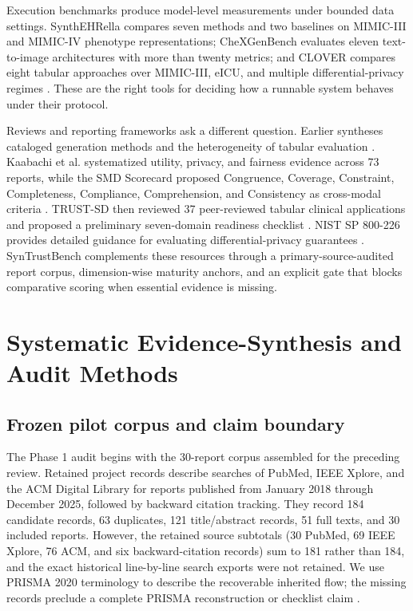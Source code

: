 \documentclass[11pt,letterpaper]{article}
\begin{document}
\endgroup

Execution benchmarks produce model-level measurements under bounded data settings. SynthEHRella compares seven methods and two baselines on MIMIC-III and MIMIC-IV phenotype representations; CheXGenBench evaluates eleven text-to-image architectures with more than twenty metrics; and CLOVER compares eight tabular approaches over MIMIC-III, eICU, and multiple differential-privacy regimes \citep{chen2025synthehrella,dutt2026chexgenbench,qi2026clover}. These are the right tools for deciding how a runnable system behaves under their protocol.

Reviews and reporting frameworks ask a different question. Earlier syntheses cataloged generation methods and the heterogeneity of tabular evaluation \citep{chen2021syntheticmedicine,hernandez2022tabularreview}. Kaabachi et al. systematized utility, privacy, and fairness evidence across 73 reports, while the SMD Scorecard proposed Congruence, Coverage, Constraint, Completeness, Compliance, Comprehension, and Consistency as cross-modal criteria \citep{kaabachi2025privacyutility,zamzmi2025scorecard}. TRUST-SD then reviewed 37 peer-reviewed tabular clinical applications and proposed a preliminary seven-domain readiness checklist \citep{castagno2026trustsd}. NIST SP 800-226 provides detailed guidance for evaluating differential-privacy guarantees \citep{near2025nist}. SynTrustBench complements these resources through a primary-source-audited report corpus, dimension-wise maturity anchors, and an explicit gate that blocks comparative scoring when essential evidence is missing.

\section{Systematic Evidence-Synthesis and Audit Methods}
\label{sec:methods}

\subsection{Frozen pilot corpus and claim boundary}

The Phase 1 audit begins with the 30-report corpus assembled for the preceding review. Retained project records describe searches of PubMed, IEEE Xplore, and the ACM Digital Library for reports published from January 2018 through December 2025, followed by backward citation tracking. They record 184 candidate records, 63 duplicates, 121 title/abstract records, 51 full texts, and 30 included reports. However, the retained source subtotals (30 PubMed, 69 IEEE Xplore, 76 ACM, and six backward-citation records) sum to 181 rather than 184, and the exact historical line-by-line search exports were not retained. We use PRISMA 2020 terminology to describe the recoverable inherited flow; the missing records preclude a complete PRISMA reconstruction or checklist claim \citep{page2021prisma}.
\end{document}
